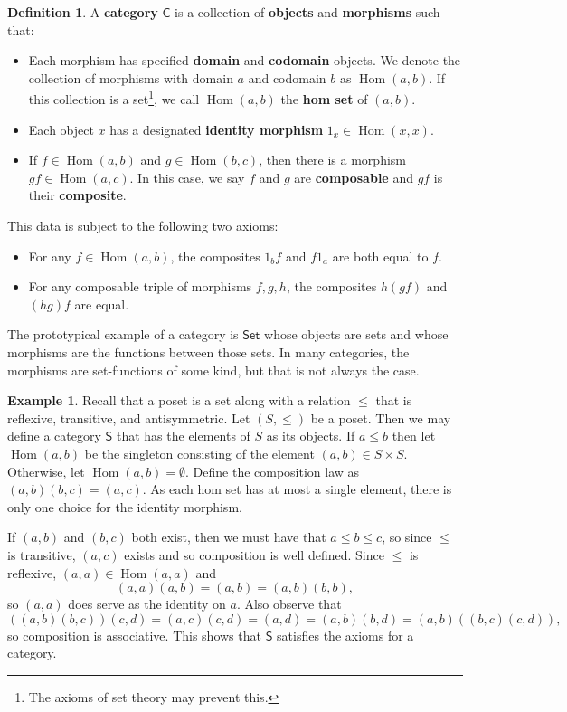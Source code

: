 \documentclass[MS, xcolor=dvipsnames]{wfuthesis}
\def\sC{\mathsf{C}}
\DeclareMathOperator{\Hom}{Hom}
\theoremstyle{definition}
\newtheorem{definition}[theorem]{Definition}
\newtheorem{example}[theorem]{Example}
\begin{document}
\begin{definition}
  A \textbf{category} $\sC$ is a collection of \textbf{objects} and \textbf{morphisms} such that:
  \begin{itemize}
    \item Each morphism has specified \textbf{domain} and \textbf{codomain} objects. We denote the collection of morphisms with domain $a$ and codomain $b$ as $\Hom(a,b)$. If this collection is a set\footnote{The axioms of set theory may prevent this.}, we call $\Hom(a,b)$ the \textbf{hom set} of $(a,b)$.
    \item Each object $x$ has a designated \textbf{identity morphism} $1_x \in \Hom(x,x)$.
    \item If $f \in \Hom(a,b)$ and $g \in \Hom(b,c)$, then there is a morphism $gf \in \Hom(a,c)$. In this case, we say $f$ and $g$ are \textbf{composable} and $gf$ is their \textbf{composite}.
  \end{itemize}
  This data is subject to the following two axioms:
  \begin{itemize}
    \item For any $f \in \Hom(a,b)$, the composites $1_bf$ and $f1_a$ are both equal to $f$.
    \item For any composable triple of morphisms $f,g,h$, the composites $h(gf)$ and $(hg)f$ are equal.
  \end{itemize}
\end{definition}
The prototypical example of a category is $\mathsf{Set}$ whose objects are sets and whose morphisms are the functions between those sets. In many categories, the morphisms are set-functions of some kind, but that is not always the case.
\begin{example}
  Recall that a poset is a set along with a relation $\le$ that is reflexive, transitive, and antisymmetric. Let $(S,\le)$ be a poset. Then we may define a category $\mathsf S$ that has the elements of $S$ as its objects. If $a \le b$ then let $\Hom(a,b)$ be the singleton consisting of the element $(a,b) \in S \times S$. Otherwise, let $\Hom(a,b)=\emptyset$. Define the composition law as $(a,b)(b,c)=(a,c)$. As each hom set has at most a single element, there is only one choice for the identity morphism. \par
  If $(a,b)$ and $(b,c)$ both exist, then we must have that $a \le b \le c$, so since $\le$ is transitive, $(a,c)$ exists and so composition is well defined. Since $\le$ is reflexive, $(a,a) \in \Hom(a,a)$ and
  \[ (a,a)(a,b) = (a,b) = (a,b)(b,b), \]
  so $(a,a)$ does serve as the identity on $a$. Also observe that
  \[ ((a,b)(b,c))(c,d) = (a,c)(c,d) = (a,d) = (a,b)(b,d) = (a,b)((b,c)(c,d)), \]
  so composition is associative. This shows that $\mathsf S$ satisfies the axioms for a category.
\end{example}
\end{document}
